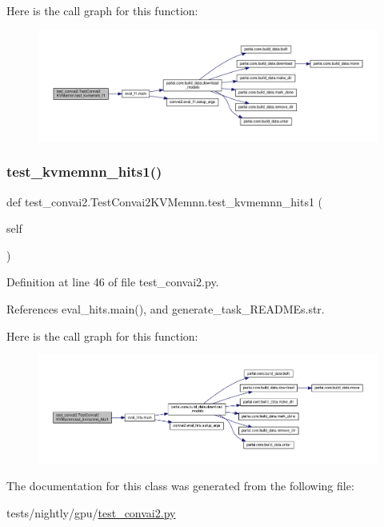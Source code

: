 Here is the call graph for this function\+:
\nopagebreak
\begin{figure}[H]
\begin{center}
\leavevmode
\includegraphics[width=350pt]{classtest__convai2_1_1TestConvai2KVMemnn_a85c9f140bc57a1f1e8b011a2034e74fc_cgraph}
\end{center}
\end{figure}
\mbox{\label{classtest__convai2_1_1TestConvai2KVMemnn_a8d4b821e481c61a125658e0ac5045762}} 
\subsubsection{\texorpdfstring{test\+\_\+kvmemnn\+\_\+hits1()}{test\_kvmemnn\_hits1()}}
{\footnotesize\ttfamily def test\+\_\+convai2.\+Test\+Convai2\+K\+V\+Memnn.\+test\+\_\+kvmemnn\+\_\+hits1 (\begin{DoxyParamCaption}\item[{}]{self }\end{DoxyParamCaption})}



Definition at line 46 of file test\+\_\+convai2.\+py.



References eval\+\_\+hits.\+main(), and generate\+\_\+task\+\_\+\+R\+E\+A\+D\+M\+Es.\+str.

Here is the call graph for this function\+:
\nopagebreak
\begin{figure}[H]
\begin{center}
\leavevmode
\includegraphics[width=350pt]{classtest__convai2_1_1TestConvai2KVMemnn_a8d4b821e481c61a125658e0ac5045762_cgraph}
\end{center}
\end{figure}


The documentation for this class was generated from the following file\+:\begin{DoxyCompactItemize}
\item 
tests/nightly/gpu/\hyperlink{test__convai2_8py}{test\+\_\+convai2.\+py}\end{DoxyCompactItemize}

